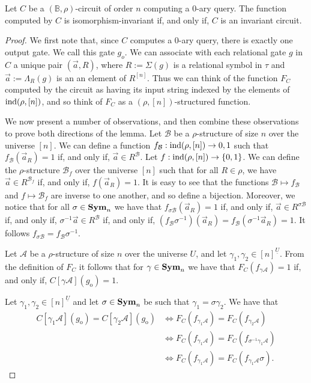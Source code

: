 \documentclass[../main/thesis.tex]{subfiles}
\begin{document}
\begin{lem}
  Let $C$ be a $(\mathbb{B}, \rho)$-circuit of order $n$ computing a $0$-ary
  query. The function computed by $C$ is isomorphism-invariant if, and only if,
  $C$ is an invariant circuit.
\end{lem}
\begin{proof}
  We first note that, since $C$ computes a $0$-ary query, there is exactly one
  output gate. We call this gate $g_o$. We can associate with each relational
  gate $g$ in $C$ a unique pair $(\vec{a}, R)$, where $R := \Sigma (g)$ is a
  relational symbol in $\tau$ and $\vec{a} := \Lambda_R(g)$ is an an element of
  $R^{[n]}$. Thus we can think of the function $F_C$ computed by the circuit as
  having its input string indexed by the elements of $\text{\upshape ind}(\rho, [n])$, and so
  think of $F_C$ as a $(\rho, [n])$-structured function.

  We now present a number of observations, and then combine these observations
  to prove both directions of the lemma. Let $\mathcal{B}$ be a $\rho$-structure
  of size $n$ over the universe $[n]$. We can define a function $f_{\mathcal{B}}
  : \text{\upshape ind}(\rho, [n]) \rightarrow {0,1}$ such that $f_{\mathcal{B}} (\vec{a}_R) =
  1$ if, and only if, $\vec{a} \in R^{\mathcal{B}}$. Let $f : \text{\upshape ind}(\rho, [n])
  \rightarrow \{0,1\}$. We can define the $\rho$-structure $\mathcal{B}_f$ over
  the universe $[n]$ such that for all $R \in \rho$, we have $\vec{a} \in
  R^{\mathcal{B}_f}$ if, and only if, $f(\vec{a}_R) = 1$. It is easy to see that
  the functions $\mathcal{B} \mapsto f_{\mathcal{B}}$ and $f \mapsto
  \mathcal{B}_f$ are inverse to one another, and so define a bijection.
  Moreover, we notice that for all $\sigma \in \text{\textbf{Sym}}_n$ we have that $f_{\sigma
    \mathcal{B}}(\vec{a}_R) = 1$ if, and only if, $\vec{a} \in R^{\sigma
    \mathcal{B}}$ if, and only if, $\sigma^{-1} \vec{a} \in R^{\mathcal{B}}$ if,
  and only if, $(f_{\mathcal{B}} \sigma^{-1})(\vec{a}_R) =
  f_{\mathcal{B}}(\sigma^{-1} \vec{a}_R)= 1$. It follows $f_{\sigma \mathcal{B}}
  = f_{\mathcal{B}} \sigma^{-1}$.

  Let $\mathcal{A}$ be a $\rho$-structure of size $n$ over the universe $U$, and
  let $\gamma_1, \gamma_2 \in [n]^{\underline{U}}$. From the definition of $F_C$
  it follows that for $\gamma \in \text{\textbf{Sym}}_n$ we have that $F_C (f_{\gamma
    \mathcal{A}})=1$ if, and only if, $C[\gamma \mathcal{A}](g_{\text{o}}) = 1$.

  Let $\gamma_1, \gamma_2 \in [n]^{\underline{U}}$ and let $\sigma \in \text{\textbf{Sym}}_n$
  be such that $\gamma_1 = \sigma \gamma_2$. We have that
  \begin{align*}
    C[\gamma_1 \mathcal{A}](g_{\text{o}}) = C[\gamma_2 \mathcal{A}](g_{\text{o}}) & \Leftrightarrow  F_C(f_{\gamma_1 \mathcal{A}}) = F_C (f_{\gamma_2 \mathcal{A}}) \\
                                                                                  & \Leftrightarrow F_C(f_{\gamma_1 \mathcal{A}}) = F_C (f_{\sigma^{-1}\gamma_1 \mathcal{A}}) \\
                                                                                  & \Leftrightarrow F_C(f_{\gamma_1 \mathcal{A}}) = F_C ( f_{\gamma_1 \mathcal{A}} \sigma).
  \end{align*}


\end{proof}
\end{document}

